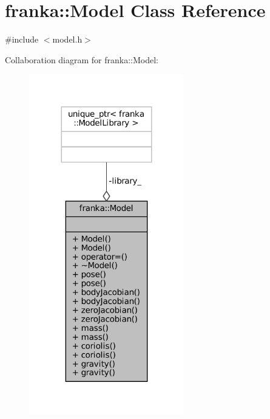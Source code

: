 \hypertarget{classfranka_1_1Model}{}\section{franka\+:\+:Model Class Reference}
\label{classfranka_1_1Model}


{\ttfamily \#include $<$model.\+h$>$}



Collaboration diagram for franka\+:\+:Model\+:
\nopagebreak
\begin{figure}[H]
\begin{center}
\leavevmode
\includegraphics[width=191pt]{classfranka_1_1Model__coll__graph}
\end{center}
\end{figure}
